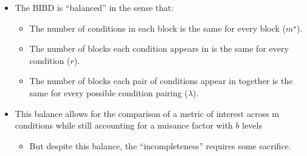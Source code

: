 \begin{itemize}
\begin{Remark}{Notation}{}
\begin{itemize}
                  \item $ m $: number of experimental conditions. In our previous example, $ m=3 $.
                  \item $ b $: number of blocks. In our previous example, $ b=6 $.
                  \item $ m^\star $: number of experimental conditions that can be run in each block. Also known as ``block size.'' In our previous example, $ m^\star=2 $.
                  \item $ r $: number of blocks in which each condition appears. In our previous example, $ r=4 $.
                  \item $ \lambda $: number of blocks that \emph{any} pair of conditions appear in together. In our previous example, $ \lambda=2 $.
              \end{itemize}
          \end{Remark}
    \item The BIBD is ``balanced'' in the sense that:
          \begin{itemize}
              \item The number of conditions in each block is the same for every block ($ m^\star $).
              \item The number of blocks each condition appears in is the same for every condition ($ r $).
              \item The number of blocks each pair of conditions appear in together is the same for every possible
                    condition pairing ($ \lambda $).
          \end{itemize}
    \item This balance allows for the comparison of a metric of interest across m conditions while still accounting
          for a nuisance factor with $b$ levels
          \begin{itemize}
              \item But despite this balance, the ``incompleteness'' requires some sacrifice.
          \end{itemize}
\end{itemize}
